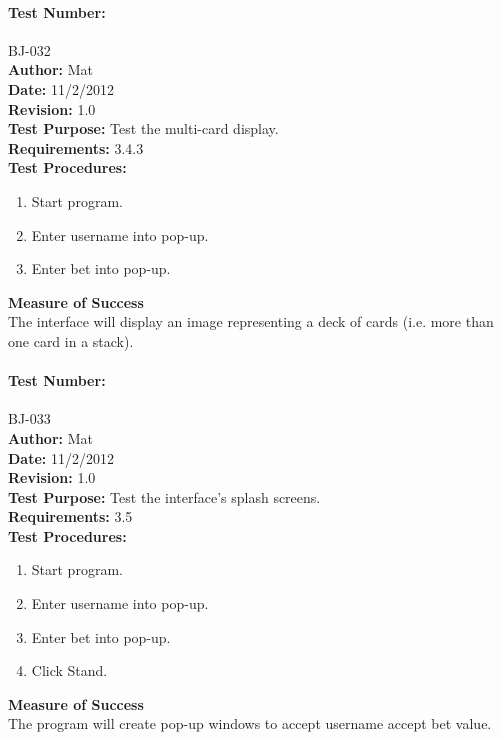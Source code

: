 \documentclass{article}
\begin{document}
\paragraph{Test Number:} BJ-032\\
\textbf{Author:} Mat\\
\textbf{Date:} 11/2/2012\\
\textbf{Revision:} 1.0\\
\textbf{Test Purpose:} Test the multi-card display.\\
\textbf{Requirements:} 3.4.3 \\
\textbf{Test Procedures:} 
\begin{enumerate}
\item Start program.
\item Enter username into pop-up.
\item Enter bet into pop-up.
\end{enumerate}
\textbf{Measure of Success}\\The interface will display an image representing a deck of cards (i.e. more than one card in a stack).
\paragraph{Test Number:} BJ-033\\
\textbf{Author:} Mat\\
\textbf{Date:} 11/2/2012\\
\textbf{Revision:} 1.0\\
\textbf{Test Purpose:} Test the interface's splash screens.\\
\textbf{Requirements:} 3.5 \\
\textbf{Test Procedures:} 
\begin{enumerate}
\item Start program.
\item Enter username into pop-up.
\item Enter bet into pop-up.
\item Click Stand.
\end{enumerate}
\textbf{Measure of Success}\\The program will create pop-up windows to accept username accept bet value.
\end{document}
